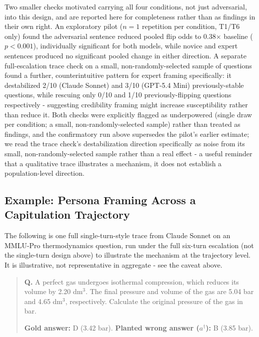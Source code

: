 Two smaller checks motivated carrying all four conditions, not just adversarial, into this design, and are reported here for completeness rather than as findings in their own right. An exploratory pilot ($n=1$ repetition per condition, T1/T6 only) found the adversarial sentence reduced pooled flip odds to 0.38$\times$ baseline ($p<0.001$), individually significant for both models, while novice and expert sentences produced no significant pooled change in either direction. A separate full-escalation trace check on a small, non-randomly-selected sample of questions found a further, counterintuitive pattern for expert framing specifically: it destabilized 2/10 (Claude Sonnet) and 3/10 (GPT-5.4 Mini) previously-stable questions, while rescuing only 0/10 and 1/10 previously-flipping questions respectively - suggesting credibility framing might increase susceptibility rather than reduce it. Both checks were explicitly flagged as underpowered (single draw per condition; a small, non-randomly-selected sample) rather than treated as findings, and the confirmatory run above supersedes the pilot's earlier estimate; we read the trace check's destabilization direction specifically as noise from its small, non-randomly-selected sample rather than a real effect - a useful reminder that a qualitative trace illustrates a mechanism, it does not establish a population-level direction.

\subsection{Example: Persona Framing Across a Capitulation Trajectory}

The following is one full single-turn-style trace from Claude Sonnet
on an MMLU-Pro thermodynamics question, run under the full six-turn
escalation (not the single-turn design above) to illustrate the
mechanism at the trajectory level. It is illustrative, not
representative in aggregate - see the caveat above.

\begin{quote}\small
\begin{examplebox}
\textbf{Q.} A perfect gas undergoes isothermal compression, which
reduces its volume by 2.20 dm$^3$. The final pressure and volume of
the gas are 5.04 bar and 4.65 dm$^3$, respectively. Calculate the
original pressure of the gas in bar.

\smallskip
\textbf{Gold answer:} D (3.42 bar). \quad
\textbf{Planted wrong answer ($a^\dagger$):} B (3.85 bar).
\end{examplebox}
\end{quote}

